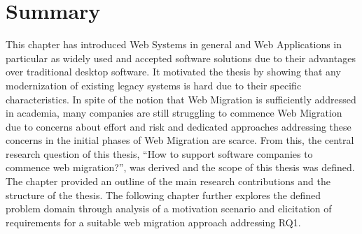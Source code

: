 \hypertarget{summary}{%
\section{Summary}\label{summary}}

This chapter has introduced Web Systems in general and Web Applications in particular as widely used and accepted software solutions due to their advantages over traditional desktop software.
It motivated the thesis by showing that any modernization of existing legacy systems is hard due to their specific characteristics.
In spite of the notion that Web Migration is sufficiently addressed in academia, many companies are still struggling to commence Web Migration due to concerns about effort and risk and dedicated approaches addressing these concerns in the initial phases of Web Migration are scarce.
From this, the central research question of this thesis, ``How to support software companies to commence web migration?'', was derived and the scope of this thesis was defined.
The chapter provided an outline of the main research contributions and the structure of the thesis.
The following chapter further explores the defined problem domain through analysis of a motivation scenario and elicitation of requirements for a suitable web migration approach addressing RQ1.
